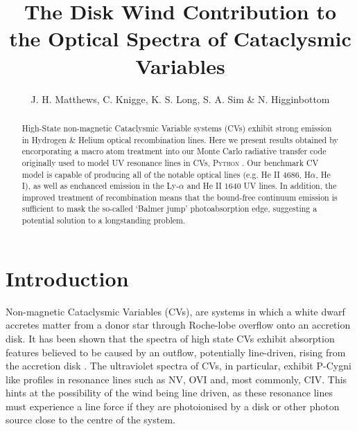 \documentclass[preprint, a4paper, 11pt]{aastex}
\begin{document}

\renewcommand{\labelitemi}{$-$}
\def\la{Ly-$\alpha$ }
\def\py{\textsc{Python} }
\def\civ{C~\textsc{iv} }
\def\araa{ARAA}
\def\nat{Nature}
\def\apjl{ApJ Letters}
\def\aapr{AAPR}
\def\ssr{SSR}
\def\apj{ApJ}
\def\pasp{PASP}
\def\aap{A\&A}
\def\mnras{MNRAS}
\def\aj{AJ}
\def\rmxaa{RMXAA}

%
%


\title{The Disk Wind Contribution to the Optical Spectra of Cataclysmic Variables}
\author{J. H.
  Matthews, C. Knigge, K. S. Long, S. A. Sim \& N. Higginbottom}


%
%




\begin{abstract}
High-State non-magnetic Cataclysmic Variable systems (CVs) exhibit strong emission in Hydrogen \& Helium 
optical recombination lines. Here we present results obtained by encorporating a macro atom treatment into
our Monte Carlo radiative transfer code originally used
to model UV resonance lines in CVs, \py. Our benchmark CV model is capable of producing
all of the notable optical lines (e.g. He II 4686, H${\alpha}$, He I), as well as
enchanced emission in the Ly-$\alpha$ and He II $1640$ UV lines.
In addition, the improved treatment of recombination means that the bound-free continuum
emission is sufficient to mask the so-called `Balmer jump' photoabsorption edge, 
suggesting a potential solution to a longstanding problem. 
\end{abstract}

\maketitle



%
%

\section{Introduction} 

Non-magnetic Cataclysmic Variables (CVs), are systems in which a white dwarf accretes matter from a donor star
through Roche-lobe overflow onto an accretion disk. It has been shown that the spectra of high state CVs
exhibit absorption features believed to be caused by an outflow, potentially line-driven,
rising from the accretion disk \citep{cordova1982}. 
The ultraviolet spectra of CVs, in particular, exhibit P-Cygni like profiles in resonance lines such as 
NV, OVI and, most commonly, CIV. This hints at the possibility of the wind being line driven, 
as these resonance lines must experience a line force if they are photoionised by a disk or other photon source
close to the centre of the system.
\end{document}

